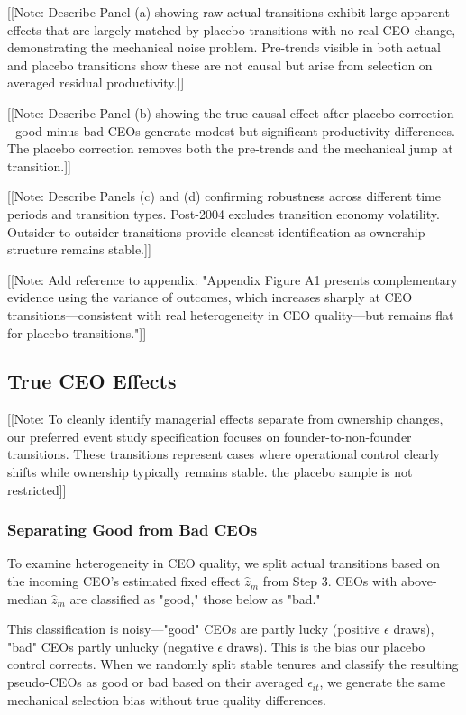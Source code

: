 \documentclass[11pt,a4paper]{article}
\begin{document}
[[Note: Describe Panel (a) showing raw actual transitions exhibit large apparent effects that are largely matched by placebo transitions with no real CEO change, demonstrating the mechanical noise problem. Pre-trends visible in both actual and placebo transitions show these are not causal but arise from selection on averaged residual productivity.]]

[[Note: Describe Panel (b) showing the true causal effect after placebo correction - good minus bad CEOs generate modest but significant productivity differences. The placebo correction removes both the pre-trends and the mechanical jump at transition.]]

[[Note: Describe Panels (c) and (d) confirming robustness across different time periods and transition types. Post-2004 excludes transition economy volatility. Outsider-to-outsider transitions provide cleanest identification as ownership structure remains stable.]]

[[Note: Add reference to appendix: "Appendix Figure A1 presents complementary evidence using the variance of outcomes, which increases sharply at CEO transitions—consistent with real heterogeneity in CEO quality—but remains flat for placebo transitions."]]

\subsection{True CEO Effects}

[[Note: To cleanly identify managerial effects separate from ownership changes, our preferred event study specification focuses on founder-to-non-founder transitions. These transitions represent cases where operational control clearly shifts while ownership typically remains stable. the placebo sample is not restricted]]

\subsubsection{Separating Good from Bad CEOs}

To examine heterogeneity in CEO quality, we split actual transitions based on the incoming CEO's estimated fixed effect $\hat{z}_m$ from Step 3. CEOs with above-median $\hat{z}_m$ are classified as "good," those below as "bad."

This classification is noisy—"good" CEOs are partly lucky (positive $\epsilon$ draws), "bad" CEOs partly unlucky (negative $\epsilon$ draws). This is the bias our placebo control corrects. When we randomly split stable tenures and classify the resulting pseudo-CEOs as good or bad based on their averaged $\epsilon_{it}$, we generate the same mechanical selection bias without true quality differences.
\end{document}
